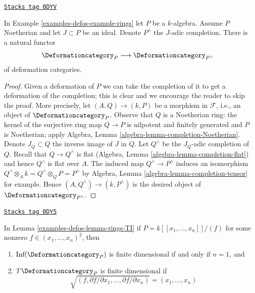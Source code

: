 \begin{lemma}[Completion]
\label{examples-defos-lemma-completion}
\href{https://stacks.math.columbia.edu/tag/0DYV}{\texttt{Stacks tag 0DYV}}

In Example \ref{examples-defos-example-rings} let $P$ be a $k$-algebra.
Assume $P$ Noetherian and let $J \subset P$ be an ideal.
Denote $P^\wedge$ the $J$-adic completion.
There is a natural functor
$$
\Deformationcategory_P \longrightarrow \Deformationcategory_{P^\wedge}
$$
of deformation categories.
\end{lemma}

\begin{proof}
Given a deformation of $P$ we can take the completion
of it to get a deformation of the completion; this is
clear and we encourage the reader to skip the proof. More precisely,
let $(A, Q) \to (k, P)$ be a morphism in $\mathcal{F}$, i.e.,
an object of $\Deformationcategory_P$. Observe that $Q$ is a Noetherian
ring: the kernel of the surjective ring map $Q \to P$ is
nilpotent and finitely generated and $P$ is Noetherian; apply
Algebra, Lemma \ref{algebra-lemma-completion-Noetherian}.
Denote $J_Q \subset Q$ the inverse
image of $J$ in $Q$. Let $Q^\wedge$ be the $J_Q$-adic completion of $Q$.
Recall that $Q \to Q^\wedge$ is flat
(Algebra, Lemma \ref{algebra-lemma-completion-flat})
and hence $Q^\wedge$ is flat over $A$.
The induced map $Q^\wedge \to P^\wedge$ induces an isomorphism
$Q^\wedge \otimes_A k = Q^\wedge \otimes_Q P = P^\wedge$ by
Algebra, Lemma \ref{algebra-lemma-completion-tensor} for example.
Hence $(A, Q^\wedge) \to (k, P^\wedge)$
is the desired object of $\Deformationcategory_{P^\wedge}$.
\end{proof}

\begin{lemma}
\label{examples-defos-lemma-power-series-rings-TI}
\href{https://stacks.math.columbia.edu/tag/0DY5}{\texttt{Stacks tag 0DY5}}

In Lemma \ref{examples-defos-lemma-rings-TI} if $P = k[[x_1, \ldots, x_n]]/(f)$
for some nonzero $f \in (x_1, \ldots, x_n)^2$, then
\begin{enumerate}
\item $\text{Inf}(\Deformationcategory_P)$ is finite dimensional
if and only if $n = 1$, and
\item $T\Deformationcategory_P$ is finite dimensional if
$$
\sqrt{(f, \partial f/\partial x_1, \ldots,  \partial f/\partial x_n)} =
(x_1, \ldots, x_n)
$$
\end{enumerate}
\end{lemma}


